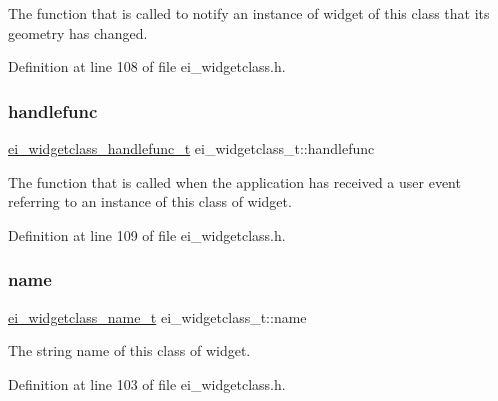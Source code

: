 The function that is called to notify an instance of widget of this class that its geometry has changed. 



Definition at line 108 of file ei\+\_\+widgetclass.\+h.

\mbox{\label{structei__widgetclass__t_a5ed633370e3c90d21244d93d5467227e}} 
\subsubsection{\texorpdfstring{handlefunc}{handlefunc}}
{\footnotesize\ttfamily \hyperlink{ei__widgetclass_8h_a480d59667e6726294cd961accf180241}{ei\+\_\+widgetclass\+\_\+handlefunc\+\_\+t} ei\+\_\+widgetclass\+\_\+t\+::handlefunc}



The function that is called when the application has received a user event referring to an instance of this class of widget. 



Definition at line 109 of file ei\+\_\+widgetclass.\+h.

\mbox{\label{structei__widgetclass__t_aa5799b5999890cf04915bf0fe5151ec8}} 
\subsubsection{\texorpdfstring{name}{name}}
{\footnotesize\ttfamily \hyperlink{ei__widgetclass_8h_acfa18ebbfac8cbbc11345a01c2099aed}{ei\+\_\+widgetclass\+\_\+name\+\_\+t} ei\+\_\+widgetclass\+\_\+t\+::name}



The string name of this class of widget. 



Definition at line 103 of file ei\+\_\+widgetclass.\+h.

\mbox{\label{structei__widgetclass__t_aa184e650475ec2451f033858db1876f0}} 
